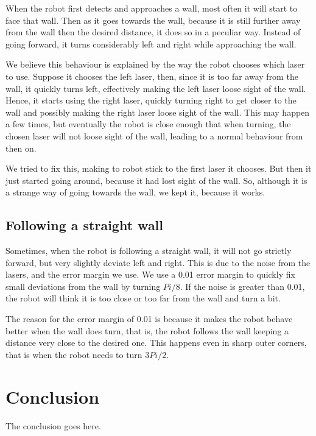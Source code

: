 \documentclass[10pt,journal,compsoc]{IEEEtran}
\begin{document}
When the robot first detects and approaches a wall, most often it will start to face that wall. Then as it goes towards the wall, because it is still further away from the wall then the desired distance, it does so in a peculiar way. Instead of going forward, it turns considerably left and right while approaching the wall.

We believe this behaviour is explained by the way the robot chooses which laser to use. Suppose it chooses the left laser, then, since it is too far away from the wall, it quickly turns left, effectively making the left laser loose sight of the wall. Hence, it starts using the right laser, quickly turning right to get closer to the wall and possibly making the right laser loose sight of the wall. This may happen a few times, but eventually the robot is close enough that when turning, the chosen laser will not loose sight of the wall, leading to a normal behaviour from then on.

We tried to fix this, making to robot stick to the first laser it chooses. But then it just started going around, because it had lost sight of the wall. So, although it is a strange way of going towards the wall, we kept it, because it works.

\subsection{Following a straight wall}

Sometimes, when the robot is following a straight wall, it will not go strictly forward, but very slightly deviate left and right. This is due to the noise from the lasers, and the error margin we use. We use a 0.01 error margin to quickly fix small deviations from the wall by turning $Pi/8$. If the noise is greater than 0.01, the robot will think it is too close or too far from the wall and turn a bit.

The reason for the error margin of 0.01 is because it makes the robot behave better when the wall does turn, that is, the robot follows the wall keeping a distance very close to the desired one. This happens even in sharp outer corners, that is when the robot needs to turn $3Pi/2$.



\section{Conclusion}
The conclusion goes here.

\ifCLASSOPTIONcaptionsoff
  \newpage
\fi



\end{document}
